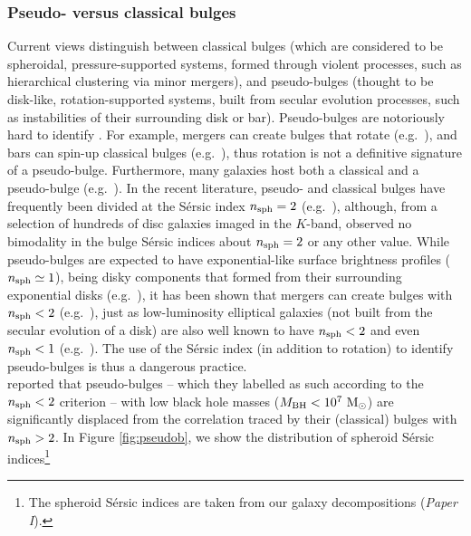 \documentclass[preprint2]{emulateapj}
\begin{document}
\subsubsection{Pseudo- versus classical bulges}
Current views distinguish between classical bulges (which are considered to be spheroidal, pressure-supported systems, 
formed through violent processes, such as hierarchical clustering via minor mergers), 
and pseudo-bulges (thought to be disk-like, rotation-supported systems, 
built from secular evolution processes, such as instabilities of their surrounding disk or bar). 
Pseudo-bulges are notoriously hard to identify \citep{graham2013review,graham2014review,graham2015pseudo,graham2015review}.
For example, mergers can create bulges that rotate (e.g.~\citealt{bekki2010,keselmannusser2012}), 
and bars can spin-up classical bulges (e.g.~\citealt{saha2012}), 
thus rotation is not a definitive signature of a pseudo-bulge. 
Furthermore, many galaxies host both a classical and a pseudo-bulge (e.g.~\citealt{erwin2003,erwin2015,athanassoula2005,Gadotti2009,
macarthur2009,dosanjosdasilva2013,seidel2015}). 
In the recent literature, pseudo- and classical bulges have frequently been divided at the 
S\'ersic index $n_{\rm sph}=2$ (e.g.~\citealt{sani2011,beifiori2012}), 
although, from a selection of hundreds of disc galaxies imaged in the $K$-band, 
\cite{grahamworley2008} observed no bimodality in the bulge S\'ersic indices about $n_{\rm sph}=2$ or any other value. 
While pseudo-bulges are expected to have exponential-like surface brightness profiles ($n_{\rm sph} \simeq 1$), 
being disky components that formed from their surrounding exponential disks 
(e.g.~\citealt{bardeen1975,hohl1975,combessanders1981,combes1990,pfennigerfriedli1991}), 
it has been shown that mergers can create bulges with $n_{\rm sph}<2$
(e.g.~\citealt{elichemoral2011,scannapieco2011,querejeta2015}), 
just as low-luminosity elliptical galaxies (not built from the secular evolution of a disk)
are also well known to have $n_{\rm sph}<2$ and even $n_{\rm sph}<1$ (e.g.~\citealt{davies1988,youngcurrie1994,jerjen2000}). 
The use of the S\'ersic index (in addition to rotation) to identify pseudo-bulges is thus a dangerous practice. \\
\cite{sani2011} reported that pseudo-bulges -- which they labelled as such according to the $n_{\rm sph}<2$ criterion -- 
with low black hole masses ($M_{\rm BH} < 10^7\rm~M_\odot$) are significantly displaced from the correlation 
traced by their (classical) bulges with $n_{\rm sph}>2$. 
In Figure \ref{fig:pseudob}, we show the distribution of spheroid S\'ersic indices\footnote{The spheroid S\'ersic indices 
are taken from our galaxy decompositions (\emph{Paper I}).} 
\end{document}
